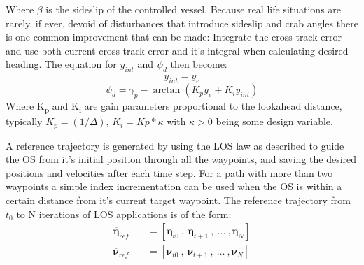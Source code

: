 Where $\beta$ is the sideslip of the controlled vessel. Because real life situations are rarely, if ever, devoid of disturbances that introduce
sideslip and crab angles there is one common improvement that can be made: Integrate the cross track error and use both current cross track error
and it's integral when calculating desired heading. The equation for $\dot{y}_{int}$ and $\psi_d$ then become:
\begin{equation}
    \dot{y}_{int} = y_e
\end{equation}
\begin{equation}
    \psi_d = \gamma_p - \arctan(K_{p}y_e + K_{i}\dot{y}_{int})
\end{equation}
Where K\textsubscript{p} and K\textsubscript{i} are gain parameters proportional to the lookahead distance, typically $K_p = (1/\varDelta)$, $K_i = Kp*\kappa$
with $\kappa > 0$ being some design variable.

A reference trajectory is generated by using the LOS law as described to guide the \gls{OS} from it's initial position through all the waypoints, and
saving the desired positions and velocities after each time step. For a path with more than two waypoints a simple index incrementation can be used when the
\gls{OS} is within a certain distance from it's current target waypoint. The reference trajectory from $t_0$ to N iterations of \gls{LOS} applications is of the form:
\begin{subequations}
    \begin{align}
        \overline{\bm{\eta}}_{ref} \quad & = [\bm{\eta}_{t0} \ , \ \bm{\eta}_{t+1} \ , \ \dots \ , \bm{\eta}_N] \\ 
        \overline{\bm{\nu}}_{ref} \quad & = [\bm{\nu}_{t0} \ , \ \bm{\nu}_{t+1} \ , \ \dots \ , \bm{\nu}_N]
    \end{align}
\end{subequations}


